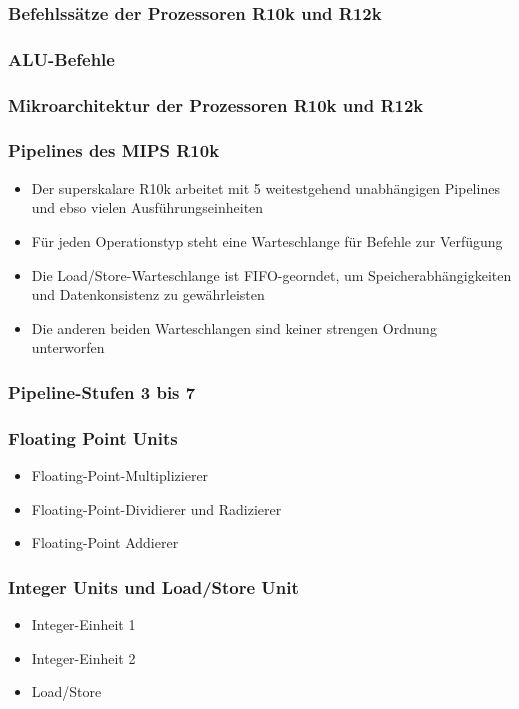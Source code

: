 \subsubsection{Befehlssätze der Prozessoren R10k und R12k}
\subsubsection{ALU-Befehle}
\subsubsection{Mikroarchitektur der Prozessoren R10k und R12k}
\subsubsection{Pipelines des MIPS R10k}
\begin{itemize}
	\item Der superskalare R10k arbeitet mit 5 weitestgehend unabhängigen Pipelines und ebso vielen Ausführungseinheiten
	\item Für jeden Operationstyp steht eine Warteschlange für Befehle zur Verfügung
	\item Die Load/Store-Warteschlange ist FIFO-georndet, um Speicherabhängigkeiten und Datenkonsistenz zu gewährleisten
	\item Die anderen beiden Warteschlangen sind keiner strengen Ordnung unterworfen
\end{itemize}
\subsubsection{Pipeline-Stufen 3 bis 7}
\subsubsection{Floating Point Units}
\begin{itemize}
	\item Floating-Point-Multiplizierer
	\item Floating-Point-Dividierer und Radizierer
	\item Floating-Point Addierer
\end{itemize}
\subsubsection{Integer Units und Load/Store Unit}
\begin{itemize}
	\item Integer-Einheit 1
	\item Integer-Einheit 2
	\item Load/Store
\end{itemize}
